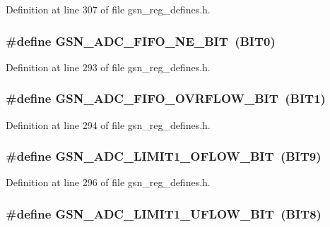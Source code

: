 Definition at line 307 of file gsn\_\-reg\_\-defines.h.

\hypertarget{a00546_a4bdc9e1f68d06ab69c0d93758c5c2ed6}{
\subsubsection[{GSN\_\-ADC\_\-FIFO\_\-NE\_\-BIT}]{\setlength{\rightskip}{0pt plus 5cm}\#define GSN\_\-ADC\_\-FIFO\_\-NE\_\-BIT~(BIT0)}}
\label{a00546_a4bdc9e1f68d06ab69c0d93758c5c2ed6}


Definition at line 293 of file gsn\_\-reg\_\-defines.h.

\hypertarget{a00546_aabf72b7a1ccd8fe6ad2eda49650f29be}{
\subsubsection[{GSN\_\-ADC\_\-FIFO\_\-OVRFLOW\_\-BIT}]{\setlength{\rightskip}{0pt plus 5cm}\#define GSN\_\-ADC\_\-FIFO\_\-OVRFLOW\_\-BIT~(BIT1)}}
\label{a00546_aabf72b7a1ccd8fe6ad2eda49650f29be}


Definition at line 294 of file gsn\_\-reg\_\-defines.h.

\hypertarget{a00546_af57bc133fd7ee0f16319d46328d16e31}{
\subsubsection[{GSN\_\-ADC\_\-LIMIT1\_\-OFLOW\_\-BIT}]{\setlength{\rightskip}{0pt plus 5cm}\#define GSN\_\-ADC\_\-LIMIT1\_\-OFLOW\_\-BIT~(BIT9)}}
\label{a00546_af57bc133fd7ee0f16319d46328d16e31}


Definition at line 296 of file gsn\_\-reg\_\-defines.h.

\hypertarget{a00546_a652777a67fe40e8b379590b885855d89}{
\subsubsection[{GSN\_\-ADC\_\-LIMIT1\_\-UFLOW\_\-BIT}]{\setlength{\rightskip}{0pt plus 5cm}\#define GSN\_\-ADC\_\-LIMIT1\_\-UFLOW\_\-BIT~(BIT8)}}
\label{a00546_a652777a67fe40e8b379590b885855d89}


